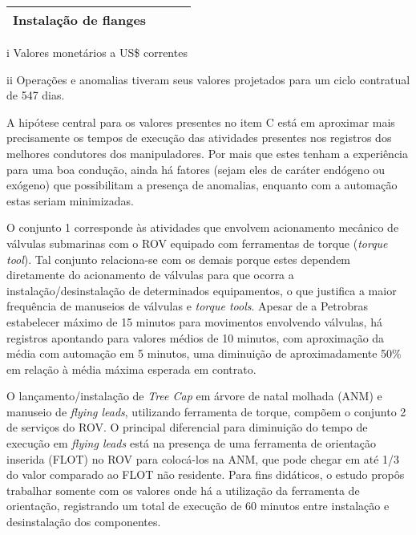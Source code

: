 \begin{table}[h!]
{\begin{threeparttable}
\begin{tabular}{l >{\centering\arraybackslash}m{3.0cm} >{\centering\arraybackslash}m{3.0cm} >{\centering\arraybackslash}m{3.0cm}}
		\hspace{3mm}Instalação de flanges              & 5                                & 180                            & 60                           \\ \hline
	\end{tabular}
    \begin{tablenotes}
        \item[i]{Valores monetários a US\$ correntes}
        \item[ii]{Operações e anomalias tiveram seus valores projetados para um ciclo contratual de 547 dias.}
    \end{tablenotes}
    \end{threeparttable}
    }
\end{table}

A hipótese central para os valores presentes no item C está em aproximar mais precisamente os tempos de execução das atividades presentes nos registros dos melhores condutores dos manipuladores. Por mais que estes tenham a experiência para uma boa condução, ainda há fatores (sejam eles de caráter endógeno ou exógeno) que possibilitam a presença de anomalias, enquanto com a automação estas seriam minimizadas.

O conjunto 1 corresponde às atividades que envolvem acionamento mecânico de válvulas submarinas com o ROV equipado com ferramentas de torque (\textit{torque tool}). Tal conjunto relaciona-se com os demais porque estes dependem diretamente do acionamento de válvulas para que ocorra a instalação/desinstalação de determinados equipamentos, o que justifica a maior frequência de manuseios de válvulas e \textit{torque tools}. Apesar de a Petrobras estabelecer máximo de 15 minutos para movimentos envolvendo válvulas, há registros apontando para valores médios de 10 minutos, com aproximação da média com automação em 5 minutos, uma diminuição de aproximadamente 50\% em relação à média máxima esperada em contrato.

O lançamento/instalação de \textit{Tree Cap} em árvore de natal molhada (ANM) e manuseio de \textit{flying leads}, utilizando ferramenta de torque, compõem o conjunto 2 de serviços do ROV. O principal diferencial para diminuição do tempo de execução em \textit{flying leads} está na presença de uma ferramenta de orientação inserida (FLOT) no ROV para colocá-los na ANM, que pode chegar em até 1/3 do valor comparado ao FLOT não residente. Para fins didáticos, o estudo propôs trabalhar somente com os valores onde há a utilização da ferramenta de orientação, registrando um total de execução de 60 minutos entre instalação e desinstalação dos componentes.

